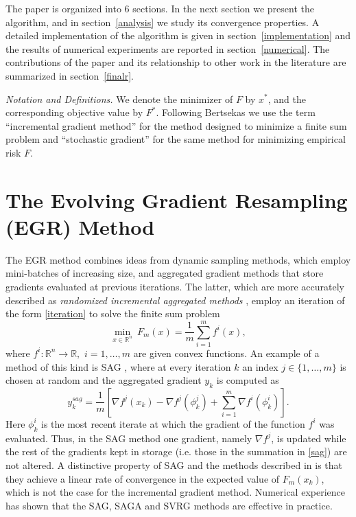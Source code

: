\documentclass[11pt]{article}
\begin{document}
The paper is organized into 6 sections. In the next section we present the algorithm, and in section~\ref{analysis} we study its convergence properties. A detailed implementation of the algorithm is given in section~\ref{implementation} and the results of numerical experiments are reported in  section~\ref{numerical}. The contributions of the paper and its relationship to other work in the literature are summarized in section~\ref{finalr}.

\bigskip\noindent
\textit{Notation and Definitions.}
We denote the minimizer of $F$ by $x^\ast$, and the corresponding objective value by $F^\ast$.  Following Bertsekas \cite{bertsekas2011incremental} we use the  term ``incremental gradient method''  for the method designed to minimize a finite sum problem and  ``stochastic gradient'' for the same method for minimizing empirical risk $F$.

\section{The Evolving Gradient Resampling (EGR) Method}
The EGR method combines ideas from dynamic sampling methods, which  employ mini-batches of increasing size, and  aggregated gradient methods that store gradients evaluated at previous iterations. The latter, which are more accurately described as \emph{randomized incremental aggregated methods}  \cite{roux2012stochastic,johnson2013accelerating,frostig2014competing,NIPS2014_5258}, employ an iteration of the form \eqref{iteration} to solve the finite sum problem
\begin{equation}
	\label{saa}
	\min_{x \in \mathbb{R}^n} \  F_m(x) = \frac{1}{m} \sum_{i =1}^m f^i(x) ,
\end{equation}
where $f^i: \mathbb{R}^n \rightarrow \mathbb{R},$ $i=1, \ldots, m$ are given convex functions. 
An example of a method of this kind is SAG \cite{roux2012stochastic}, where at every iteration $k$ an index $j \in \{1, \ldots, m\}$  is chosen at random and the aggregated gradient $y_k$ is computed as
\begin{equation}   \label{sag} 
     y_k^{sag}= \frac{1}{m} \left[ \nabla f^j(x_k) -  \nabla f^j(\phi_k^j) + \sum_{i=1}^{m}  \nabla f^i (\phi^i_k) \right].
     \end{equation}
Here $\phi^i_k$ is the most recent iterate at which the gradient of the function $f^i$ was evaluated. Thus, in the SAG method one gradient, namely  $\nabla f^j$,  is updated while the rest of the gradients kept in storage (i.e. those in the summation in \eqref{sag}) are not altered. A distinctive property of SAG  and the methods described in  \cite{johnson2013accelerating,NIPS2014_5258,shalev2013stochastic,mairal2015incremental,defazio2014finito} 
is that they achieve a linear rate of convergence in the expected value of $F_m(x_k)$, which is not the case for the incremental gradient method. Numerical experience has shown that the SAG, SAGA and SVRG methods are effective in practice.
\end{document}
